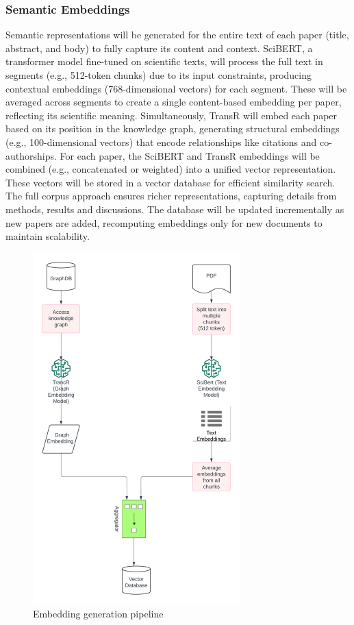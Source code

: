\documentclass[a4paper,12pt]{article}
\begin{document}
\subsubsection{Semantic Embeddings}
Semantic representations will be generated for the entire text of each paper
(title, abstract, and body) to fully capture its content and context. SciBERT,
a transformer model fine-tuned on scientific texts, will process the full text
in segments (e.g., 512-token chunks) due to its input constraints, producing
contextual embeddings (768-dimensional vectors) for each segment. These will be
averaged across segments to create a single content-based embedding per paper,
reflecting its scientific meaning. Simultaneously, TransR will embed each paper
based on its position in the knowledge graph, generating structural embeddings
(e.g., 100-dimensional vectors) that encode relationships like citations and
co-authorships. For each paper, the SciBERT
\parencite{beltagy2019scibertpretrainedlanguagemodel} and TransR
\parencite{10.3233/JIFS-202177} embeddings will be combined (e.g., concatenated or
weighted) into a unified vector representation. These vectors will be stored in a
vector database for efficient similarity search. The full corpus approach ensures
richer representations, capturing details from methods, results and discussions.
The database will be updated incrementally as new papers are added, recomputing
embeddings only for new documents to maintain scalability.
\begin{figure}[H]
    \centering
    \includegraphics[width=8cm]{semanticembedding.png}
    \caption{Embedding generation pipeline}
\end{figure}
\newpage
\end{document}
